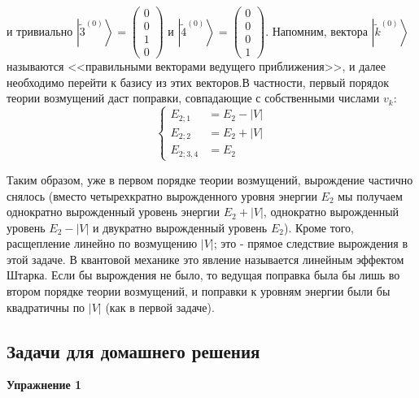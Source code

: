 \documentclass[a4paper,12pt]{article}
\begin{document}
\noindent
и тривиально $\left|\widetilde{3}^{(0)}\right\rangle =\begin{pmatrix}0\\
0\\
1\\
0
\end{pmatrix}$ и $\left|\widetilde{4}^{(0)}\right\rangle =\begin{pmatrix}0\\
0\\
0\\
1
\end{pmatrix}$. Напомним, вектора $\left|\widetilde{k}^{(0)}\right\rangle $ называются
<<правильными векторами ведущего приближения>>, и далее необходимо
перейти к базису из этих векторов.В частности, первый порядок теории
возмущений даст поправки, совпадающие с собственными числами $v_{k}$:
\[
\begin{cases}
E_{2;1} & =E_{2}-\left|V\right|\\
E_{2;2} & =E_{2}+\left|V\right|\\
E_{2;3,4} & =E_{2}
\end{cases}
\]


\noindent
Таким образом, уже в первом порядке теории возмущений, вырождение
частично снялось (вместо четырехкратно вырожденного уровня энергии
$E_{2}$ мы получаем однократно вырожденный уровень энергии $E_{2}+|V|$,
однократно вырожденный уровень $E_{2}-|V|$ и двукратно вырожденный
уровень $E_{2}$). Кроме того, расщепление линейно по возмущению $|V|$;
это - прямое следствие вырождения в этой задаче. В квантовой механике
это явление называется линейным эффектом Штарка. Если бы вырождения
не было, то ведущая поправка была бы лишь во втором порядке теории
возмущений, и поправки к уровням энергии были бы квадратичны по $|V|$
(как в первой задаче).


\subsection*{Задачи для домашнего решения}

\noindent \textbf{Упражнение 1}
\end{document}
